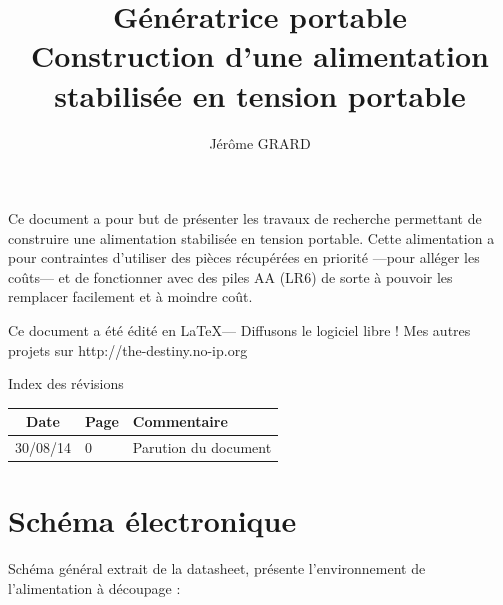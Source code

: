 \documentclass[12pt]{article}
\title{Génératrice portable \\ Construction d'une alimentation \\ stabilisée en tension portable}
\author{Jérôme GRARD}
\newenvironment{remarque}{%
\begin{lrbox}{\boiteremarque}%
\begin{minipage}{.8\textwidth}}{%
\end{minipage}
\end{lrbox}%
\begin{center}
\fbox{\usebox{\boiteremarque}}
\end{center}}
\begin{document}
\maketitle
\thispagestyle{empty}

\begin{remarque}
	Ce document a pour but de présenter les travaux de recherche permettant de construire une
	alimentation stabilisée en tension portable. Cette alimentation a pour contraintes d'utiliser
	des pièces récupérées en priorité ---pour alléger les coûts--- et de fonctionner avec des
	piles AA (LR6) de sorte à pouvoir les remplacer facilement et à moindre coût.\newline
	\begin{center}
		Ce document a été édité en \LaTeX --- Diffusons le logiciel libre ! \newline
		Mes autres projets sur http://the-destiny.no-ip.org
	\end{center}
\end{remarque}




\newpage
\thispagestyle{empty}
Index des révisions\newline

\begin{center}
	\begin{tabular}{|c|l|l|}
		\hline
		Date		& Page		& Commentaire				\\ \hline
		30/08/14	& 0		& Parution du document			\\
		\hline
	\end{tabular}
\end{center}








\newpage
\pagestyle{plain}
\setcounter{page}{1}
\tableofcontents








\newpage
\section{Schéma électronique}

Schéma général extrait de la datasheet, présente l'environnement de l'alimentation à découpage :\newline
\end{document}
